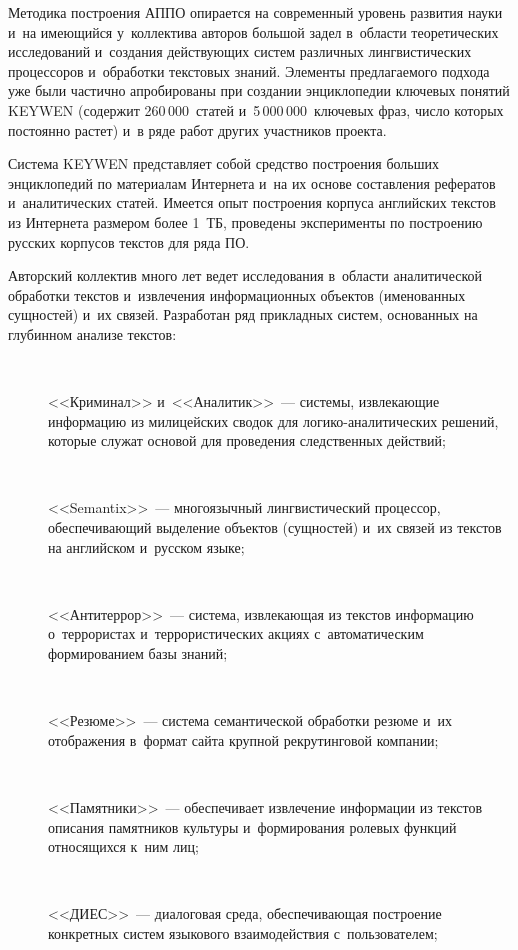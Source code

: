 \begin{multicols}{2}
     \vspace*{-2pt}

      Методика построения АППО опирается на современный уровень
развития науки и~на име\-ющий\-ся у~коллектива авторов большой задел в~об\-ласти теоретических исследований и~создания действующих систем
различных лингвистических процессоров и~обработки текстовых знаний.
Элементы предлагаемого подхода уже были частично апробированы при
создании энциклопедии ключевых понятий KEYWEN (содержит
260\,000~статей и~5\,000\,000~ключевых фраз, число которых постоянно
растет) и~в ряде работ других участников проекта.

     Система KEYWEN представляет собой средство построения больших
энциклопедий по материалам Интернета и~на их основе составления
рефератов и~аналитических статей. Имеется опыт построения корпуса
английских текстов из Интернета размером более 1~ТБ, проведены
эксперименты по по\-стро\-ению русских корпусов текстов для ряда
ПО.

     Авторский коллектив много лет ведет исследования в~области
аналитической обработки текстов и~извлечения информационных объектов
(именованных сущностей) и~их связей. Разработан ряд прикладных систем,
основанных на глубинном анализе текстов:
\begin{description}
\item[\,]
     <<Криминал>> и~<<Аналитик>>~--- системы, извле\-ка\-ющие
информацию из милицейских сводок для ло\-ги\-ко-ана\-ли\-ти\-че\-ских
решений, которые служат основой для проведения следственных действий;
\item[\,]
     <<Semantix>>~--- многоязычный лингвистический процессор,
обеспечивающий выделение объектов (сущностей) и~их связей из текстов на
английском и~русском языке;
\item[\,]
     <<Антитеррор>>~--- система, извлекающая из текстов информацию о~террористах и~террористических акциях с~автоматическим формированием
базы знаний;
\item[\,]
     <<Резюме>>~--- система семантической обработки резюме и~их
отображения в~формат сайта крупной рекрутинговой компании;
\item[\,]
     <<Памятники>>~--- обеспечивает извлечение информации из текстов
описания памятников культуры и~формирования ролевых функций
относящихся к~ним лиц;
\item[\,]
     <<ДИЕС>>~--- диалоговая среда, обеспечивающая построение
конкретных систем языкового взаимодействия с~пользователем;


\end{description}
\end{multicols}
